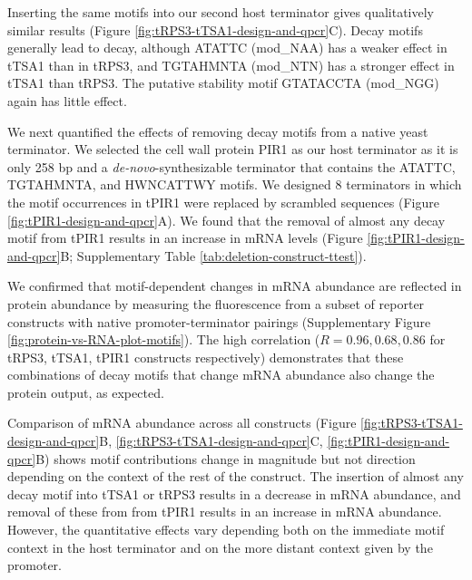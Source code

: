 \documentclass[../main.tex]{subfiles}
\begin{document}
Inserting the same motifs into our second host terminator gives qualitatively similar results (Figure \ref{fig:tRPS3-tTSA1-design-and-qpcr}C).
Decay motifs generally lead to decay, although ATATTC (mod\_NAA) has a weaker effect in tTSA1 than in tRPS3, and TGTAHMNTA (mod\_NTN) has a stronger effect in tTSA1 than tRPS3.
The putative stability motif GTATACCTA (mod\_NGG) again has little effect.

We next quantified the effects of removing decay motifs from a native yeast terminator.
We selected the cell wall protein PIR1 as our host terminator as it is only 258 bp \parencite{Pelechano2013} and a \emph{de-novo}-synthesizable terminator that contains the ATATTC, TGTAHMNTA, and HWNCATTWY motifs.
We designed 8 terminators in which the motif occurrences in tPIR1 were replaced by scrambled sequences (Figure \ref{fig:tPIR1-design-and-qpcr}A).
We found that the removal of almost any decay motif from tPIR1 results in an increase in mRNA levels (Figure \ref{fig:tPIR1-design-and-qpcr}B; Supplementary Table \ref{tab:deletion-construct-ttest}).

We confirmed that motif-dependent changes in mRNA abundance are reflected in protein abundance by measuring the fluorescence from a subset of reporter constructs with native promoter-terminator pairings (Supplementary Figure \ref{fig:protein-vs-RNA-plot-motifs}).
The high correlation (\(R = 0.96, 0.68, 0.86\) for tRPS3, tTSA1, tPIR1 constructs respectively) demonstrates that these combinations of decay motifs that change mRNA abundance also change the protein output, as expected.

Comparison of mRNA abundance across all constructs (Figure \ref{fig:tRPS3-tTSA1-design-and-qpcr}B, \ref{fig:tRPS3-tTSA1-design-and-qpcr}C, \ref{fig:tPIR1-design-and-qpcr}B) shows motif contributions change in magnitude but not direction depending on the context of the rest of the construct.
The insertion of almost any decay motif into tTSA1 or tRPS3 results in a decrease in mRNA abundance, and removal of these from from tPIR1 results in an increase in mRNA abundance.
However, the quantitative effects vary depending both on the immediate motif context in the host terminator and on the more distant context given by the promoter.
\end{document}
